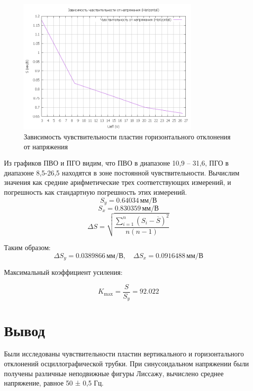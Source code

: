 \begin{figure}[ht!]
\centering
\includegraphics[width=0.8\textwidth]{SensHorizontal_graph.png}
\caption{Зависимость чувствительности пластин горизонтального отклонения от напряжения}
\label{fig:plot}
\end{figure}

Из графиков ПВО и ПГО видим, что ПВО в диапазоне 10,9 – 31,6, ПГО в диапазоне 8,5-26,5 находятся в зоне постоянной чувствительности. Вычислим значения как средние арифметические трех соответствующих измерений, и погрешность как стандартную погрешность этих измерений.
\[
S_y = 0.64034\, \text{мм/В}
\]
\[
S_x = 0.830359 \, \text{мм/В}
\]
\[
\Delta S = \sqrt{\frac{\sum_{i=1}^{n} (S_i - \overline{S})^2}{n(n-1)}}
\]

Таким образом:
\[
\Delta S_y = 0.0389866 \, \text{мм/В}, \quad \Delta S_x = 0.0916488 \, \text{мм/В}
\]

Максимальный коэффициент усиления:

\[
K_{\text{max}} = \frac{S}{S_y} = 92.022
\]


\section{Вывод}
Были исследованы чувствительности пластин вертикального и горизонтального отклонений осциллографической трубки. При синусоидальном напряжении были получены различные неподвижные фигуры Лиссажу, вычислено среднее напряжение, равное 50 ± 0,5 Гц.

\begin{thebibliography}{9}

\url{}  

\end{thebibliography}
\clearpage
\appendix